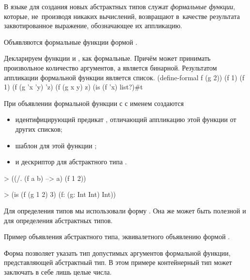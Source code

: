 В языке \Scheme для создания новых абстрактных типов служат \emph{формальные функции}, которые, не~производя никаких вычислений, возвращают в~качестве результата заквотированное выражение, обозначающее их аппликацию.

Объявляются формальные функции формой .

\begin{example}{%
Декларируем функции  и , как формальные. Причём  может принимать произвольное количество аргументов, а  является бинарной. Результатом аппликации формальной функции является список.}
\REPLin
  {(define-formal f (g 2))}
\REPL
  {(f 1)}
  {(f 1)}
\REPL
  {(f (g 'x 'y) 'z)}
  {(f (g x y) z)}
\REPL
  {(is (f 'x) list?)}{#t}
\end{example}

\begin{example}{%
При объявлении формальной функции с с именем  создаются
\begin{itemize}
\item идентифицирующий предикат , отличающий аппликацию этой функции от других списков; 
\item шаблон для этой функции ; 
\item и дескриптор для абстрактного типа .
\end{itemize}}
\smallskip
\begin{ExampleCode}
> ((/. (f a b) --> a) 
   (f 1 2))
\end{ExampleCode}
\smallskip
\begin{ExampleCode}
> (is (f (g 1 2) 3)
      (f: (g: Int Int) Int))
\end{ExampleCode}
\end{example}

Для определения типов мы использовали форму . Она же может быть полезной и для определения абстрактных типов.

\begin{example}{%
Пример объявления абстрактного типа, эквивалетного объявлению формой .}
\end{example}
\begin{example}{%
Форма  позволяет указать тип допустимых аргументов формальной функции, представляющей абстрактный тип. В этом примере контейнерный тип  может заключать в себе лишь целые числа.}
\end{example}



